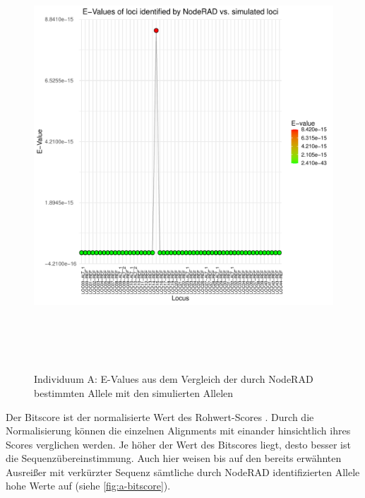 \begin{figure}[H]
	\begin{center}
		\includegraphics[height=16cm]{bilder/evaluation/evalues/A.plot_evalues.pdf}
		\caption{Individuum A: E-Values aus dem Vergleich der durch NodeRAD bestimmten Allele mit den simulierten Allelen}
		\label{fig:a-eval}
	\end{center}
\end{figure}

Der Bitscore ist der normalisierte Wert des Rohwert-Scores \cite{gaedeke_2007}. Durch die Normalisierung können die einzelnen Alignments mit einander hinsichtlich ihres Scores verglichen werden. Je höher der Wert des Bitscores liegt, desto besser ist die Sequenzübereinstimmung. Auch hier weisen bis auf den bereits erwähnten Ausreißer mit verkürzter Sequenz sämtliche durch NodeRAD identifizierten Allele hohe Werte auf (siehe \autoref{fig:a-bitscore}).

